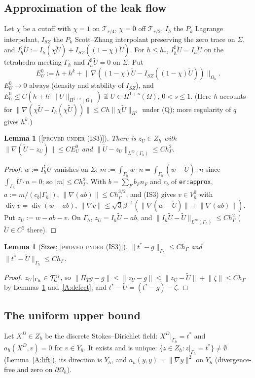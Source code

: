 \documentclass[11pt,reqno]{amsart}
\theoremstyle{plain}
\newtheorem{lemma}[theorem]{Lemma}
\theoremstyle{definition}
\newcommand{\status}[1]{\textup{\textsc{[#1]}}}
\newcommand{\hG}{h_\Gamma}
\newcommand{\Gh}{\Gamma_h}
\newcommand{\Oh}{\Omega_h}
\newcommand{\VO}{V_h^0}
\newcommand{\Zh}{Z_h}
\newcommand{\norm}[1]{\lVert #1\rVert}
\renewcommand{\div}{\operatorname{div}}
\newcommand{\Ut}{\tilde U}
\newcommand{\Yh}{Y_h}
\newcommand{\Tr}{\mathcal T^{\rm tr}_h}
\begin{document}
\subsection{Approximation of the leak flow}
Let $\chi$ be a cutoff with $\chi=1$ on $\mathcal T_{r/4}$, $\chi=0$ off $\mathcal T_{r/2}$, $I_h$ the $P_k$ Lagrange interpolant, $I_{SZ}$ the $P_k$ Scott--Zhang interpolant preserving the zero trace on $\Sigma$, and $I_h^\sharp\Ut:=I_h(\chi\Ut)+I_{SZ}((1-\chi)\Ut)$. For $h\le h_\ast$, $I_h^\sharp\Ut=I_h\Ut$ on the tetrahedra meeting $\Gh$ and $I^\sharp_h\Ut=0$ on $\Sigma$. Put
\[
E^0_U:=h+h^k+\norm{\nabla((1-\chi)\Ut-I_{SZ}((1-\chi)\Ut))}_{\Oh}.
\]
$E^0_U\to0$ always (density and stability of $I_{SZ}$), and $E^0_U\le C(h+h^s\norm U_{H^{1+s}(\Omega)})$ if $U\in H^{1+s}(\Omega)$, $0<s\le1$. (Here $h$ accounts for $\norm{\nabla(\chi\Ut-I_h(\chi\Ut))}\le Ch\norm{\chi\Ut}_{H^2}$ under (Q); more regularity of $q$ gives $h^k$.)

\begin{lemma}[\status{proved under (IS3)}]\label{A:zU}
There is $z_U\in\Zh$ with $\norm{\nabla(\Ut-z_U)}\le CE^0_U$ and $\norm{\Ut-z_U}_{L^\infty(\Gh)}\le C\hG^2$.
\end{lemma}
\begin{proof}
$w:=I^\sharp_h\Ut$ vanishes on $\Sigma$; $m:=\int_{\Gh}w\cdot n=\int_{\Gh}(w-\Ut)\cdot n$ since $\int_{\Gh}\Ut\cdot n=0$; so $|m|\le C\hG^2$. With $b=\sum_{F}b_Fn_F$ and $c_b$ of \texttt{er:approx}, $a:=m/(c_b|\Gh|)$, $\norm{\nabla(ab)}\le C\hG^{3/2}$, and (IS3) gives $v\in\VO$ with $\div v=\div(w-ab)$, $\norm{\nabla v}\le\sqrt3\beta^{-1}(\norm{\nabla(w-\Ut)}+\norm{\nabla(ab)})$. Put $z_U:=w-ab-v$. On $\Gh$, $z_U=I_h\Ut-ab$, and $\norm{I_h\Ut-\Ut}_{L^\infty(\Gh)}\le C\hG^2$ ($\Ut\in C^2$ there).
\end{proof}

\begin{lemma}[Sizes; \status{proved under (IS3)}]\label{A:size}
$\norm{t^\ast-g}_{\Gh}\le C\hG$ and $\norm{t^\ast-\Ut}_{\Gh}\le C\hG$.
\end{lemma}
\begin{proof}
$z_U|_{\Gh}\in\Tr$, so $\norm{\Pi_Tg-g}\le\norm{z_U-g}\le\norm{z_U-\Ut}+\norm\zeta\le C\hG$ by Lemmas~\ref{A:zU} and~\ref{A:defect}; and $t^\ast-\Ut=(t^\ast-g)-\zeta$.
\end{proof}

\subsection{The uniform upper bound}
Let $X^D\in\Zh$ be the discrete Stokes--Dirichlet field: $X^D|_{\Gh}=t^\ast$ and $a_h(X^D,v)=0$ for $v\in\Yh$. It exists and is unique: $\{z\in\Zh:z|_{\Gh}=t^\ast\}\ne\emptyset$ (Lemma~\ref{A:lift}), its direction is $\Yh$, and $a_h(y,y)=\norm{\nabla y}^2$ on $\Yh$ (divergence-free and zero on $\partial\Oh$).
\end{document}
